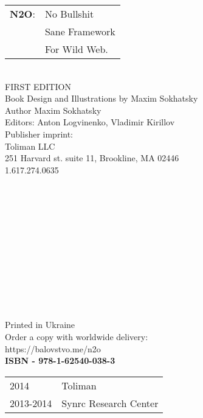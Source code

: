 \begingroup
{}
\parindent 0pt
\parskip
\baselineskip

\begin{tabular}{ll}
{\bf N2O}: & No Bullshit \\
    & Sane Framework \\
    & For Wild Web. \\
\end{tabular}
\\

FIRST EDITION \\

Book Design and Illustrations by Maxim Sokhatsky \\
Author Maxim Sokhatsky \\
Editors: Anton Logvinenko, Vladimir Kirillov \\

Publisher imprint: \\
Toliman LLC \\
251 Harvard st. suite 11, Brookline, MA 02446 \\
1.617.274.0635 \\
\\
\\
\\
\\
\\
\\
\\
\\
\\
\\
\\
\\


Printed in Ukraine \\

Order a copy with worldwide delivery: \\
https://balovstvo.me/n2o \\

{\bf  ISBN - 978-1-62540-038-3\hspace{2em}}

\begin{tabular}{ll}
\textcopyright{} 2014 & Toliman \\
\textcopyright{} 2013-2014 & Synrc Research Center
\end{tabular}

\endgroup

   \thispagestyle{empty}
 